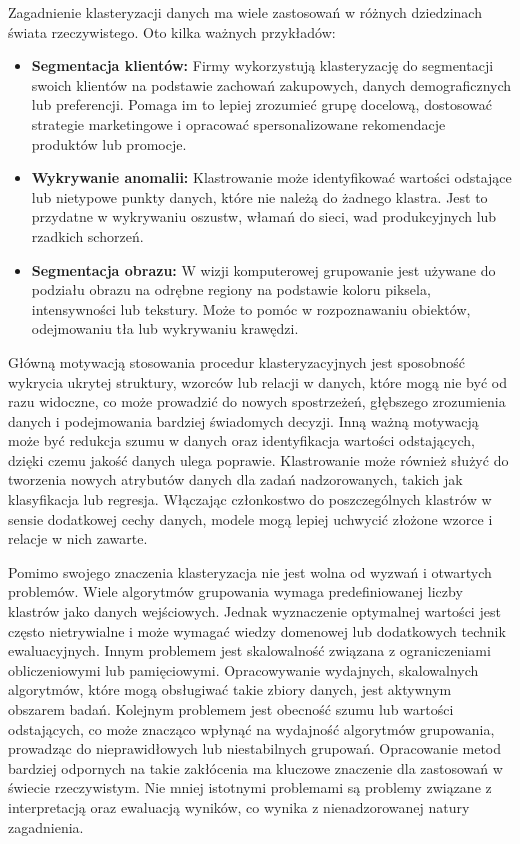 \documentclass[12pt,a4paper,oneside]{book}
\theoremstyle{definition}
\begin{document}
Zagadnienie klasteryzacji danych ma wiele zastosowań w różnych dziedzinach świata rzeczywistego. Oto kilka ważnych przykładów:
\begin{itemize}
\item \textbf{Segmentacja klientów:} Firmy wykorzystują klasteryzację do segmentacji swoich klientów na podstawie zachowań zakupowych, danych demograficznych lub preferencji. Pomaga im to lepiej zrozumieć grupę docelową, dostosować strategie marketingowe i opracować spersonalizowane rekomendacje produktów lub promocje.
\item \textbf{Wykrywanie anomalii:} Klastrowanie może identyfikować wartości odstające lub nietypowe punkty danych, które nie należą do żadnego klastra. Jest to przydatne w wykrywaniu oszustw, włamań do sieci, wad produkcyjnych lub rzadkich schorzeń.
\item \textbf{Segmentacja obrazu:} W wizji komputerowej grupowanie jest używane do podziału obrazu na odrębne regiony na podstawie koloru piksela, intensywności lub tekstury. Może to pomóc w rozpoznawaniu obiektów, odejmowaniu tła lub wykrywaniu krawędzi.
\end{itemize}

Główną motywacją stosowania procedur klasteryzacyjnych jest sposobność wykrycia ukrytej struktury, wzorców lub relacji w danych, które mogą nie być od razu widoczne, co może prowadzić do nowych spostrzeżeń, głębszego zrozumienia danych i podejmowania bardziej świadomych decyzji. Inną ważną motywacją może być redukcja szumu w danych oraz identyfikacja wartości odstających, dzięki czemu jakość danych ulega poprawie. Klastrowanie może również służyć do tworzenia nowych atrybutów danych dla zadań nadzorowanych, takich jak klasyfikacja lub regresja. Włączając członkostwo do poszczególnych klastrów w sensie dodatkowej cechy danych, modele mogą lepiej uchwycić złożone wzorce i relacje w nich zawarte.

Pomimo swojego znaczenia klasteryzacja nie jest wolna od wyzwań i otwartych problemów. Wiele algorytmów grupowania wymaga predefiniowanej liczby klastrów jako danych wejściowych. Jednak wyznaczenie optymalnej wartości jest często nietrywialne i może wymagać wiedzy domenowej lub dodatkowych technik ewaluacyjnych. Innym problemem jest skalowalność związana z ograniczeniami obliczeniowymi lub pamięciowymi. Opracowywanie wydajnych, skalowalnych algorytmów, które mogą obsługiwać takie zbiory danych, jest aktywnym obszarem badań. Kolejnym problemem jest obecność szumu lub wartości odstających, co może znacząco wpłynąć na wydajność algorytmów grupowania, prowadząc do nieprawidłowych lub niestabilnych grupowań. Opracowanie metod bardziej odpornych na takie zakłócenia ma kluczowe znaczenie dla zastosowań w świecie rzeczywistym. Nie mniej istotnymi problemami są problemy związane z interpretacją oraz ewaluacją wyników, co wynika z nienadzorowanej natury zagadnienia.
\end{document}

